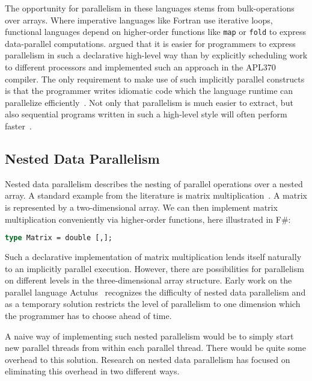 \documentclass[a4paper]{article}
\begin{document}
The opportunity for parallelism in these languages stems from bulk-operations over arrays. Where imperative languages like Fortran use iterative loops, functional languages depend on higher-order functions like \texttt{map} or \texttt{fold} to express data-parallel computations. \citet{Ching:1990:APA:97808.97826} argued that it is easier for programmers to express parallelism in such a declarative high-level way than by explicitly scheduling work to different processors and implemented such an approach in the APL370 compiler. The only requirement to make use of such implicitly parallel constructs is that the programmer writes idiomatic code which the language runtime can parallelize efficiently~\cite{Bernecky:2015:AEP:2774959.2774962}. Not only that parallelism is much easier to extract, but also sequential programs written in such a high-level style will often perform faster~\cite{Bernecky:2015:AEP:2774959.2774962}.

\subsection{Nested Data Parallelism}
\label{sec:nest-data-parall}

Nested data parallelism describes the nesting of parallel operations over a nested array. A standard example from the literature is matrix multiplication~\cite{Keller:2010:RSP:1863543.1863582}. A matrix is represented by a two-dimensional array. We can then implement matrix multiplication conveniently via higher-order functions, here illustrated in F\#:

\begin{lstlisting}[language=ML]
type Matrix = double [,];
\end{lstlisting}

Such a declarative implementation of matrix multiplication lends itself naturally to an implicitly parallel execution. However, there are possibilities for parallelism on different levels in the three-dimensional array structure. Early work on the parallel language Actulus~\cite{Perrott:1979:LAV:357073.357075} recognizes the difficulty of nested data parallelism and as a temporary solution restricts the level of parallelism to one dimension which the programmer has to choose ahead of time.

A naive way of implementing such nested parallelism would be to simply start new parallel threads from within each parallel thread. There would be quite some overhead to this solution. Research on nested data parallelism has focused on eliminating this overhead in two different ways.
\end{document}
